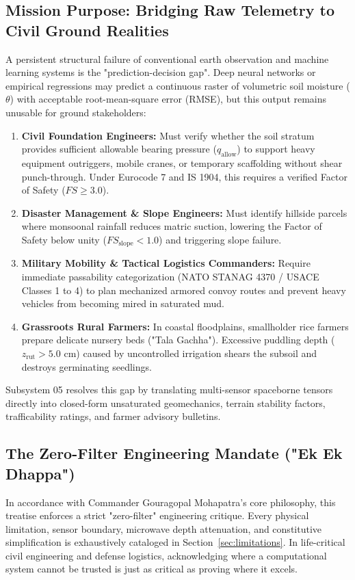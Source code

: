 \documentclass[11pt,a4paper]{article}
\theoremstyle{definition}
\theoremstyle{remark}
\begin{document}
\subsection{Mission Purpose: Bridging Raw Telemetry to Civil Ground Realities}
A persistent structural failure of conventional earth observation and machine learning systems is the "prediction-decision gap". Deep neural networks or empirical regressions may predict a continuous raster of volumetric soil moisture ($\theta$) with acceptable root-mean-square error (RMSE), but this output remains unusable for ground stakeholders:
\begin{enumerate}
    \item \textbf{Civil Foundation Engineers:} Must verify whether the soil stratum provides sufficient allowable bearing pressure ($q_{\text{allow}}$) to support heavy equipment outriggers, mobile cranes, or temporary scaffolding without shear punch-through. Under Eurocode 7 and IS 1904, this requires a verified Factor of Safety ($FS \ge 3.0$).
    \item \textbf{Disaster Management \& Slope Engineers:} Must identify hillside parcels where monsoonal rainfall reduces matric suction, lowering the Factor of Safety below unity ($FS_{\text{slope}} < 1.0$) and triggering slope failure.
    \item \textbf{Military Mobility \& Tactical Logistics Commanders:} Require immediate passability categorization (NATO STANAG 4370 / USACE Classes 1 to 4) to plan mechanized armored convoy routes and prevent heavy vehicles from becoming mired in saturated mud.
    \item \textbf{Grassroots Rural Farmers:} In coastal floodplains, smallholder rice farmers prepare delicate nursery beds ("Tala Gachha"). Excessive puddling depth ($z_{\text{rut}} > 5.0\text{ cm}$) caused by uncontrolled irrigation shears the subsoil and destroys germinating seedlings.
\end{enumerate}

Subsystem 05 resolves this gap by translating multi-sensor spaceborne tensors directly into closed-form unsaturated geomechanics, terrain stability factors, trafficability ratings, and farmer advisory bulletins.

\subsection{The Zero-Filter Engineering Mandate ("Ek Ek Dhappa")}
In accordance with Commander Gouragopal Mohapatra's core philosophy, this treatise enforces a strict "zero-filter" engineering critique. Every physical limitation, sensor boundary, microwave depth attenuation, and constitutive simplification is exhaustively cataloged in Section~\ref{sec:limitations}. In life-critical civil engineering and defense logistics, acknowledging where a computational system cannot be trusted is just as critical as proving where it excels.
\end{document}
